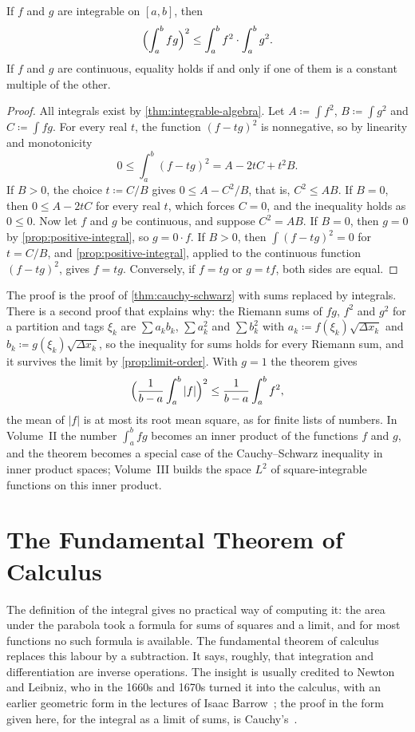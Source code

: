 \begin{theorem}
\label{thm:cauchy-schwarz-integral}
If $f$ and $g$ are integrable on $[a,b]$, then
\[
\Bigl(\int_a^bfg\Bigr)^2\le\int_a^bf^2\cdot\int_a^bg^2 .
\]
If $f$ and $g$ are continuous, equality holds if and only if one of them is a constant multiple of the other.
\end{theorem}

\begin{proof}
All integrals exist by \cref{thm:integrable-algebra}. Let $A\coloneqq\int f^2$, $B\coloneqq\int g^2$ and $C\coloneqq\int fg$. For every real $t$, the function $(f-tg)^2$ is nonnegative, so by linearity and monotonicity
\[
0\le\int_a^b(f-tg)^2=A-2tC+t^2B .
\]
If $B>0$, the choice $t\coloneqq C/B$ gives $0\le A-C^2/B$, that is, $C^2\le AB$. If $B=0$, then $0\le A-2tC$ for every real $t$, which forces $C=0$, and the inequality holds as $0\le0$. Now let $f$ and $g$ be continuous, and suppose $C^2=AB$. If $B=0$, then $g=0$ by \cref{prop:positive-integral}, so $g=0\cdot f$. If $B>0$, then $\int(f-tg)^2=0$ for $t=C/B$, and \cref{prop:positive-integral}, applied to the continuous function $(f-tg)^2$, gives $f=tg$. Conversely, if $f=tg$ or $g=tf$, both sides are equal.
\end{proof}

The proof is the proof of \cref{thm:cauchy-schwarz} with sums replaced by integrals. There is a second proof that explains why: the Riemann sums of $fg$, $f^2$ and $g^2$ for a partition and tags $\xi_k$ are $\sum a_kb_k$, $\sum a_k^2$ and $\sum b_k^2$ with $a_k\coloneqq f(\xi_k)\sqrt{\Delta x_k}$ and $b_k\coloneqq g(\xi_k)\sqrt{\Delta x_k}$, so the inequality for sums holds for every Riemann sum, and it survives the limit by \cref{prop:limit-order}. With $g=1$ the theorem gives
\[
\Bigl(\frac1{b-a}\int_a^b|f|\Bigr)^2\le\frac1{b-a}\int_a^bf^2 ,
\]
the mean of $|f|$ is at most its root mean square, as for finite lists of numbers. In Volume~II the number $\int_a^bfg$ becomes an inner product of the functions $f$ and $g$, and the theorem becomes a special case of the Cauchy--Schwarz inequality in inner product spaces; Volume~III builds the space $L^2$ of square-integrable functions on this inner product.

\section{The Fundamental Theorem of Calculus}
\label{sec:ftc}

The definition of the integral gives no practical way of computing it: the area under the parabola took a formula for sums of squares and a limit, and for most functions no such formula is available. The fundamental theorem of calculus replaces this labour by a subtraction. It says, roughly, that integration and differentiation are inverse operations. The insight is usually credited to Newton and Leibniz, who in the 1660s and 1670s turned it into the calculus, with an earlier geometric form in the lectures of Isaac Barrow~\cite{edwards1979}; the proof in the form given here, for the integral as a limit of sums, is Cauchy's~\cite{cauchy1823,grabiner1981}.

